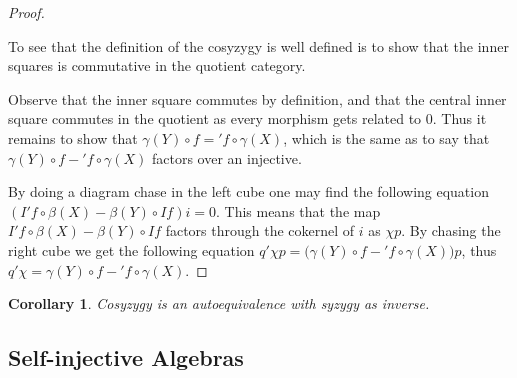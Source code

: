 \documentclass[12pt]{article}
\newtheorem{corollary}{Corollary}[theorem]
\theoremstyle{definition}
\theoremstyle{remark}
\begin{document}
\begin{proof}
\begin{center}
                \end{center}
                To see that the definition of the cosyzygy is well defined is to show that the inner squares is commutative in the quotient category.
                
                Observe that the inner square commutes by definition, and that the central inner square commutes in the quotient as every morphism gets related to $0$. Thus it remains to show that \underline{$\gamma (Y)\circ$$f$}$=$\underline{$'f\circ\gamma (X)$}, which is the same as to say that $\gamma (Y)\circ$$f-$$'f\circ\gamma (X)$ factors over an injective.

                By doing a diagram chase in the left cube one may find the following equation $(I'f\circ \beta(X)-\beta (Y)\circ If)i=0$. This means that the map $I'f\circ \beta(X)-\beta (Y)\circ If$ factors through the cokernel of $i$ as $\chi p$. By chasing the right cube we get the following equation $q'\chi p = (\gamma (Y)\circ$$f-$$'f\circ\gamma (X))p$, thus $q'\chi =$$\gamma (Y)\circ$$f-$$'f\circ\gamma (X)$.
            \end{proof}

            \begin{corollary}
                Cosyzygy is an autoequivalence with syzygy as inverse.
            \end{corollary}



        \subsection{Self-injective Algebras}
\end{document}
